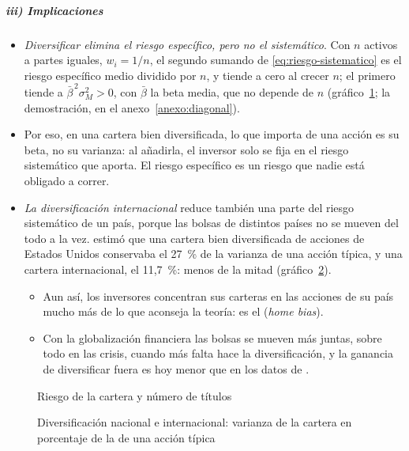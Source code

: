 \documentclass[11pt]{article}
\begin{document}
\subparagraph{iii) Implicaciones}

\begin{itemize}
\item \emph{Diversificar elimina el riesgo específico, pero no el sistemático}. Con $n$ activos a partes iguales, $w_i=1/n$, el segundo sumando de \eqref{eq:riesgo-sistematico} es el riesgo específico medio dividido por $n$, y tiende a cero al crecer $n$; el primero tiende a $\bar\beta^{\,2}\sigma_M^2>0$, con $\bar\beta$ la beta media, que no depende de $n$ (gráfico~\ref{fig:diversificacion}; la demostración, en el anexo~\ref{anexo:diagonal}).
\item Por eso, en una cartera bien diversificada, lo que importa de una acción es su beta, no su varianza: al añadirla, el inversor solo se fija en el riesgo sistemático que aporta. El riesgo específico es un riesgo que nadie está obligado a correr.
\item \emph{La diversificación internacional} reduce también una parte del riesgo sistemático de un país, porque las bolsas de distintos países no se mueven del todo a la vez. \textcite{Solnik1974Why} estimó que una cartera bien diversificada de acciones de Estados Unidos conservaba el 27~\% de la varianza de una acción típica, y una cartera internacional, el 11,7~\%: menos de la mitad (gráfico~\ref{fig:diversificacion-internacional}).
  \begin{itemize}
  \item Aun así, los inversores concentran sus carteras en las acciones de su país mucho más de lo que aconseja la teoría: es el  (\emph{home bias})\nocite{FrenchPoterba1991}.
  \item Con la globalización financiera las bolsas se mueven más juntas, sobre todo en las crisis, cuando más falta hace la diversificación, y la ganancia de diversificar fuera es hoy menor que en los datos de .
  \end{itemize}
\end{itemize}
\begin{figure}[H]
\centering
\caption{Riesgo de la cartera y número de títulos}\label{fig:diversificacion}
\end{figure}
\begin{figure}[H]
\centering
\caption{Diversificación nacional e internacional: varianza de la cartera en porcentaje de la de una acción típica}\label{fig:diversificacion-internacional}
\end{figure}
\end{document}

